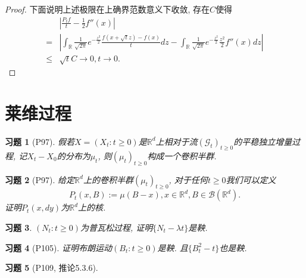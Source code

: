 \documentclass[UTF8,ondside]{ctexart}
\newtheorem{exercise}{习题}[section]
\newcommand{\h}{\mathscr}
\newcommand{\kx}{\mathbb}
\numberwithin{equation}{section}
\begin{document}
\begin{proof}
		下面说明上述极限在上确界范数意义下收敛, 存在$C$使得
		\[\begin{aligned}
			&\left|\frac{P_t f}{t} - \frac{1}{2}f''(x)\right|\\
			=&\left|
			\int_{\kx R} \frac{1}{\sqrt{2\pi}} e^{- \frac{z^2}{2}} \frac{f(x+\sqrt{t}z)-f(x)}{t} dz-\int_{\kx R} \frac{1}{\sqrt{2\pi}} e^{- \frac{z^2}{2}} \frac{z^2}{2} f''(x)dz
			\right|\\
			\leq & \sqrt{t} C\rightarrow 0, t\rightarrow 0.
		\end{aligned}
		\]
	\end{proof}
	\newpage
	\section{莱维过程}
	\begin{exercise}[P97]
		假若$X=(X_t:t\geq 0)$是$\kx R^d$上相对于流$(\h G_t)_{t\geq 0}$的平稳独立增量过程, 记$X_t-X_0$的分布为$\mu_t$, 则$(\mu_t)_{t\geq 0}$构成一个卷积半群.
	\end{exercise}
	\begin{exercise}[P97]
		给定$\kx R^d$上的卷积半群$(\mu_t)_{t\geq 0}$, 对于任何$t\geq 0$我们可以定义
		\[
			P_t(x,B):=\mu(B-x),x\in\kx R^d,B\in\h B(\kx R^d).
		\]
		证明$P_t(x,dy)$为$\kx R^d$上的核.
	\end{exercise}
	\begin{exercise}
		$(N_t:t\geq 0)$为普瓦松过程, 证明$\{N_t-\lambda t\}$是鞅.
   \end{exercise}
	\begin{exercise}[P105]
		证明布朗运动$(B_t:t\geq 0)$是鞅. 且$\{B_t^2-t\}$也是鞅. 
	\end{exercise}
	\begin{exercise}[P109, 推论5.3.6]
	\end{exercise}
	
\end{document}
